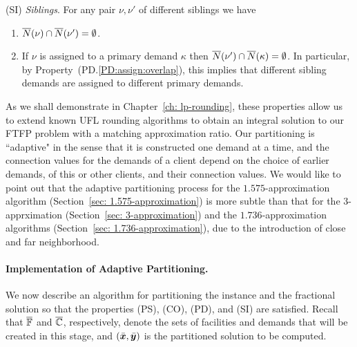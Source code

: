 \documentclass[oneside,final]{ucr}
\begin{document}
\begin{description}
\begin{enumerate}
\begin{enumerate}
			\end{enumerate}

	\end{enumerate}
	
\item{(SI)} \emph{Siblings}. For any pair $\nu,\nu'$ of different siblings we have
  \begin{enumerate}

	\item \label{SI:siblings disjoint}
		  ${\overline{N}}(\nu)\cap {\overline{N}}(\nu') = \emptyset$.
		
	\item \label{SI:primary disjoint} If $\nu$ is assigned to a primary demand $\kappa$ then
 		${\overline{N}}(\nu')\cap {\overline{N}}(\kappa) = \emptyset$. In particular, by Property~(PD.\ref{PD:assign:overlap}),
		this implies that different sibling demands are assigned to different primary demands.

	\end{enumerate}
	
\end{description}

As we shall demonstrate in Chapter~\ref{ch: lp-rounding}, these properties allow us
to extend known UFL rounding algorithms to obtain an integral solution
to our FTFP problem with a matching approximation ratio. Our
partitioning is ``adaptive" in the sense that it is constructed one
demand at a time, and the connection values for the demands of a
client depend on the choice of earlier demands, of this or other
clients, and their connection values. We would like to point out that
the adaptive partitioning process for the $1.575$-approximation
algorithm (Section~\ref{sec: 1.575-approximation}) is more subtle than that for 
the $3$-apprximation (Section~\ref{sec: 3-approximation}) and the
$1.736$-approximation algorithms (Section~\ref{sec:
  1.736-approximation}), due to the introduction of close and far
neighborhood.


\paragraph{Implementation of Adaptive Partitioning.}
We now describe an algorithm for partitioning the instance
and the fractional solution so that the properties (PS),
(CO), (PD), and (SI) are satisfied.  Recall that
$\overline{\mathbb{F}}$ and $\overline{\mathbb{C}}$, respectively, denote the
sets of facilities and demands that will be created in this
stage, and $(\bar{\boldsymbol{x}},\bar{\boldsymbol{y}})$ is the partitioned solution
to be computed. 
\end{document}
